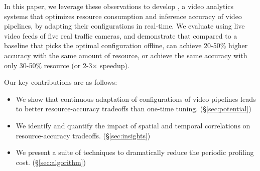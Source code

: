 In this paper, we leverage these observations to develop {\name}, a video analytics systems that optimizes resource consumption and inference accuracy of video pipelines, by adapting their configurations in real-time. We evaluate {\name} using live video feeds of five real traffic cameras, and demonstrate that compared to a baseline that picks the optimal configuration offline,
\name can achieve 20-50\% higher accuracy with the same amount of resource, or achieve the same accuracy with only 30-50\% resource (or 2-3$\times$ speedup).

Our key contributions are as follows:\vspace{-.1in}
\begin{itemize}
    \item We show that continuous adaptation of \nn configurations of video pipelines leads to better resource-accuracy tradeoffs than one-time tuning. (\S\ref{sec:potential}) \vspace{-.1in}
    \item We identify and quantify the impact of spatial and temporal correlations on resource-accuracy tradeoffs. (\S\ref{sec:insights}) \vspace{-.1in}
    \item We present a suite of techniques
    to dramatically reduce the periodic profiling cost. (\S\ref{sec:algorithm})\vspace{-.05in}
\end{itemize}



